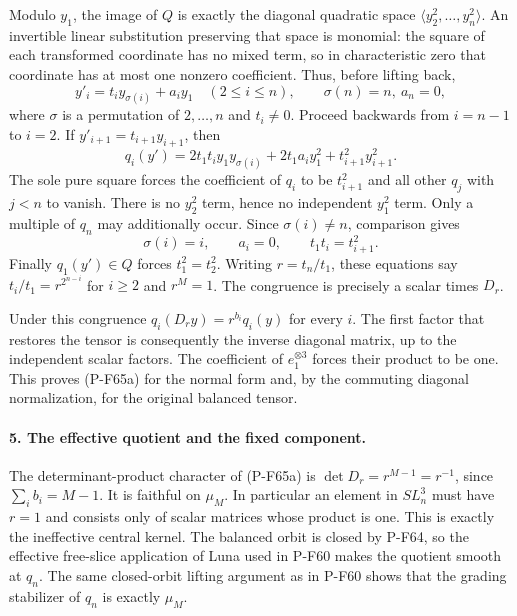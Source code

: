 Modulo $y_1$, the image of $Q$ is exactly the diagonal quadratic
space $\langle y_2^2,\ldots,y_n^2\rangle$.
An invertible linear substitution preserving that space is
monomial: the square of each transformed coordinate has no
mixed term, so in characteristic zero that coordinate has at
most one nonzero coefficient.  Thus, before lifting back,
\[
 y'_i=t_i y_{\sigma(i)}+a_i y_1\quad(2\le i\le n),
 \qquad \sigma(n)=n,\ a_n=0,
\]
where $\sigma$ is a permutation of $2,\ldots,n$ and $t_i\ne0$.
Proceed backwards from $i=n-1$ to $i=2$.  If
$y'_{i+1}=t_{i+1}y_{i+1}$, then
\[
 q_i(y')=2t_1t_i y_1y_{\sigma(i)}+2t_1a_i y_1^2
                                  +t_{i+1}^2y_{i+1}^2.
\]
The sole pure square forces the coefficient of $q_i$ to be
$t_{i+1}^2$ and all other $q_j$ with $j<n$ to vanish.
There is no $y_2^2$ term, hence no independent $y_1^2$ term.
Only a multiple of $q_n$ may additionally occur.  Since
$\sigma(i)\ne n$, comparison gives
\[
       \sigma(i)=i,\qquad a_i=0,\qquad t_1t_i=t_{i+1}^2.
\]
Finally $q_1(y')\in Q$ forces $t_1^2=t_2^2$.
Writing $r=t_n/t_1$, these equations say
$t_i/t_1=r^{2^{n-i}}$ for $i\ge2$ and $r^M=1$.
The congruence is precisely a scalar times $D_r$.

Under this congruence $q_i(D_r y)=r^{b_i}q_i(y)$ for every $i$.
The first factor that restores the tensor is consequently the
inverse diagonal matrix, up to the independent scalar factors.
The coefficient of $e_1^{\otimes3}$ forces their product to be
one.  This proves (P-F65a) for the normal form and, by the commuting
diagonal normalization, for the original balanced tensor.

\paragraph{5. The effective quotient and the fixed component.}
The determinant-product character of (P-F65a) is
$\det D_r=r^{M-1}=r^{-1}$, since
$\sum_i b_i=M-1$.  It is faithful on $\mu_M$.
In particular an element in $SL_n^3$ must have $r=1$ and consists
only of scalar matrices whose product is one.  This is exactly
the ineffective central kernel.  The balanced orbit is closed
by P-F64, so the effective free-slice application of Luna used
in P-F60 makes the quotient smooth at $q_n$.
The same closed-orbit lifting argument as in P-F60 shows that
the grading stabilizer of $q_n$ is exactly $\mu_M$.

